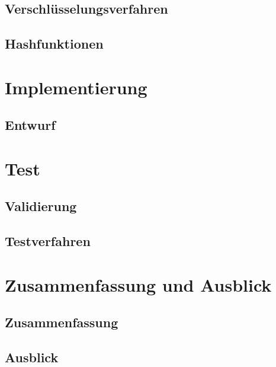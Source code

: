 \documentclass[10pt, a4paper]{scrreprt}
\begin{document}
\section{Verschlüsselungsverfahren}
\section{Hashfunktionen}

\chapter{Implementierung}
\section{Entwurf}

\chapter{Test}
\section{Validierung}
\section{Testverfahren}

\chapter{Zusammenfassung und Ausblick}
\section{Zusammenfassung}
\section{Ausblick}








\end{document}
